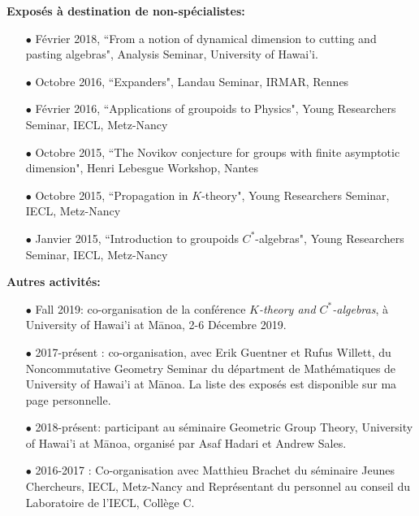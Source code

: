 \documentclass[a4paper,11pt]{article}
\newcommand\espace{\vrule height 20pt width 0pt}
\begin{document}
\textbf{Expos\'es \`a destination de non-sp\'ecialistes:}\\

\begin{itemize}
\item[$\bullet$] F\'evrier 2018, ``From a notion of dynamical dimension to cutting and pasting algebras", Analysis Seminar, University of Hawai'i.
\item[$\bullet$] Octobre 2016, ``Expanders", Landau Seminar, IRMAR, Rennes %
\item[$\bullet$] F\'evrier 2016, ``Applications of groupoids to Physics", Young Researchers Seminar, IECL, Metz-Nancy
\item[$\bullet$] Octobre 2015, ``The Novikov conjecture for groups with finite asymptotic dimension", Henri Lebesgue Workshop, Nantes
\item[$\bullet$] Octobre 2015, ``Propagation in $K$-theory", Young Researchers Seminar, IECL, Metz-Nancy
\item[$\bullet$] Janvier 2015, ``Introduction to groupoids $C^*$-algebras", Young Researchers Seminar, IECL, Metz-Nancy
\end{itemize}
\espace

\textbf{Autres activit\'es:} 
\begin{itemize}
\item[$\bullet$] Fall 2019: co-organisation de la conf\'erence \textit{$K$-theory and $C^*$-algebras}, \`a University of Hawai'i at M\={a}noa, 2-6 D\'ecembre 2019. 
\item[$\bullet$] 2017-pr\'esent : co-organisation, avec Erik Guentner et Rufus Willett, du Noncommutative Geometry Seminar du d\'epartment de Math\'ematiques de University of Hawai'i at M\={a}noa. La liste des expos\'es est disponible sur ma page personnelle.
\item[$\bullet$] 2018-pr\'esent: participant au s\'eminaire Geometric Group Theory, University of Hawai'i at M\={a}noa, organis\'e par Asaf Hadari et Andrew Sales.
\item[$\bullet$] 2016-2017 : Co-organisation avec Matthieu Brachet du s\'eminaire Jeunes Chercheurs, IECL, Metz-Nancy and Représentant du personnel au conseil du Laboratoire de l'IECL, Collège C.
\end{itemize}

\newpage
\end{document}
